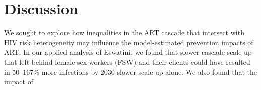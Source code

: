 \section{Discussion}\label{art.disc}
We sought to explore how inequalities in the ART cascade
that intersect with HIV risk heterogeneity
may influence the model-estimated prevention impacts of ART.
In our applied analysis of Eswatini, we found that
slower cascade scale-up that left behind female sex workers (FSW) and their clients
could have resulted in 50--167\% more infections by 2030 \vs slower scale-up alone.
We also found that the impact of
